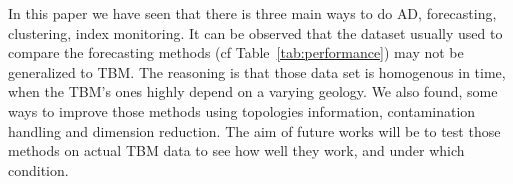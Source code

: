 \documentclass[../../main/main.tex]{subfiles}
\begin{document}
    In this paper we have seen that there is three main ways to do \ac{AD}, forecasting, clustering, index monitoring. 
    It can be observed that the dataset usually used to compare the forecasting methods (cf Table~\ref{tab:performance}) may not be generalized to \ac{TBM}.
    The reasoning is that those data set is homogenous in time, when the \ac{TBM}'s ones highly depend on a varying geology.  
    We also found, some ways to improve those methods using topologies information, contamination handling and dimension reduction. 
    The aim of future works will be to test those methods on actual \ac{TBM} data to see how well they work, and under which condition.
\end{document}
